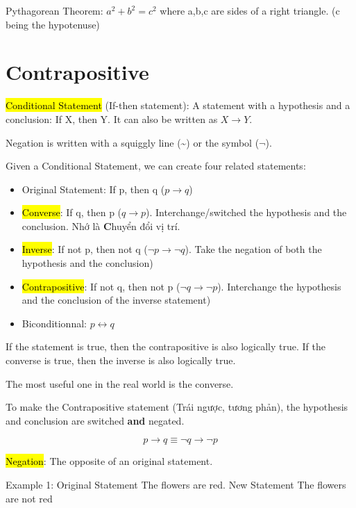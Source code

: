 Pythagorean Theorem: $a^{2}+b^{2}=c^{2}$ where a,b,c are sides of a right triangle. (c being the hypotenuse)

\section{Contrapositive}

\hl{Conditional Statement} (If-then statement): A statement with a hypothesis and a conclusion: If X, then Y. It can also be written as $X \rightarrow Y$.

Negation is written with a squiggly line (\textasciitilde) or the symbol ($\neg$).

Given a Conditional Statement, we can create four related statements:

\begin{itemize}
  \item Original Statement: If p, then q ($p \rightarrow q$)
  \item \hl{Converse}: If q, then p ($q \rightarrow p$). Interchange/switched the hypothesis and the conclusion. Nhớ  là \textbf{C}huyển đổi vị trí.
  \item \hl{Inverse}: If not p, then not q ($\neg p \rightarrow \neg q$). Take the negation of both the hypothesis and the conclusion)
  \item \hl{Contrapositive}: If not q, then not p ($\neg q \rightarrow \neg p$). Interchange the hypothesis and the conclusion of the inverse statement)
  \item Biconditionnal: $p \longleftrightarrow q$
\end{itemize}

If the statement is true, then the contrapositive is also logically true. If the converse is true, then the inverse is also logically true.

The most useful one in the real world is the converse.

\vspace{0.5cm}

To make the Contrapositive statement (Trái ngược, tương phản), the hypothesis and conclusion are switched \textbf{and} negated.

\[p \rightarrow q \equiv \neg q \rightarrow \neg p\]

\vspace{0.5cm}

\hl{Negation}: The opposite of an original statement.

Example 1: Original Statement The flowers are red. New Statement The flowers are not red

